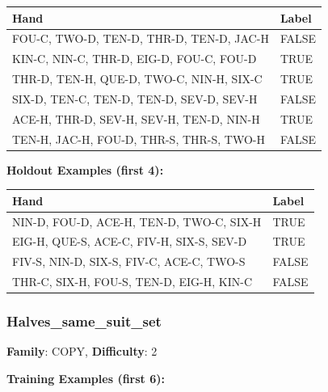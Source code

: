 \documentclass[10pt,a4paper]{article}
\begin{document}
\begin{small}
\begin{tabular}{p{8cm}l}
\toprule
Hand & Label \\
\midrule
FOU-C, TWO-D, TEN-D, THR-D, TEN-D, JAC-H & \textcolor{negative}{FALSE} \\
KIN-C, NIN-C, THR-D, EIG-D, FOU-C, FOU-D & \textcolor{positive}{TRUE} \\
THR-D, TEN-H, QUE-D, TWO-C, NIN-H, SIX-C & \textcolor{positive}{TRUE} \\
SIX-D, TEN-C, TEN-D, TEN-D, SEV-D, SEV-H & \textcolor{negative}{FALSE} \\
ACE-H, THR-D, SEV-H, SEV-H, TEN-D, NIN-H & \textcolor{positive}{TRUE} \\
TEN-H, JAC-H, FOU-D, THR-S, THR-S, TWO-H & \textcolor{negative}{FALSE} \\
\bottomrule
\end{tabular}
\end{small}

\textbf{Holdout Examples (first 4):}

\begin{small}
\begin{tabular}{p{8cm}l}
\toprule
Hand & Label \\
\midrule
NIN-D, FOU-D, ACE-H, TEN-D, TWO-C, SIX-H & \textcolor{positive}{TRUE} \\
EIG-H, QUE-S, ACE-C, FIV-H, SIX-S, SEV-D & \textcolor{positive}{TRUE} \\
FIV-S, NIN-D, SIX-S, FIV-C, ACE-C, TWO-S & \textcolor{negative}{FALSE} \\
THR-C, SIX-H, FOU-S, TEN-D, EIG-H, KIN-C & \textcolor{negative}{FALSE} \\
\bottomrule
\end{tabular}
\end{small}

\vspace{0.5cm}

\subsubsection{Halves\_same\_suit\_set}

\textbf{Family}: COPY, \textbf{Difficulty}: 2

\textbf{Training Examples (first 6):}
\end{document}
